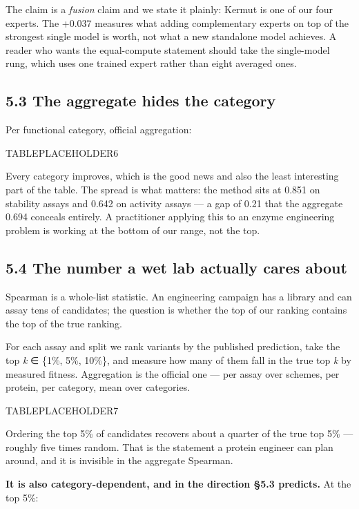 The claim is a \emph{fusion} claim and we state it plainly: Kermut is one of our four experts. The +0.037
measures what adding complementary experts on top of the strongest single model is worth, not what a new
standalone model achieves. A reader who wants the equal-compute statement should take the single-model
rung, which uses one trained expert rather than eight averaged ones.

\hypertarget{the-aggregate-hides-the-category}{%
\subsection{5.3 The aggregate hides the category}\label{the-aggregate-hides-the-category}}

Per functional category, official aggregation:

TABLEPLACEHOLDER6

Every category improves, which is the good news and also the least interesting part of the table. The
spread is what matters: the method sits at 0.851 on stability assays and 0.642 on activity assays --- a
gap of 0.21 that the aggregate 0.694 conceals entirely. A practitioner applying this to an enzyme
engineering problem is working at the bottom of our range, not the top.

\hypertarget{the-number-a-wet-lab-actually-cares-about}{%
\subsection{5.4 The number a wet lab actually cares about}\label{the-number-a-wet-lab-actually-cares-about}}

Spearman is a whole-list statistic. An engineering campaign has a library and can assay tens of
candidates; the question is whether the top of our ranking contains the top of the true ranking.

For each assay and split we rank variants by the published prediction, take the top \emph{k} ∈ \{1\%, 5\%, 10\%\},
and measure how many of them fall in the true top \emph{k} by measured fitness. Aggregation is the official
one --- per assay over schemes, per protein, per category, mean over categories.

TABLEPLACEHOLDER7

Ordering the top 5\% of candidates recovers about a quarter of the true top 5\% --- roughly five times
random. That is the statement a protein engineer can plan around, and it is invisible in the aggregate
Spearman.

\textbf{It is also category-dependent, and in the direction §5.3 predicts.} At the top 5\%:

